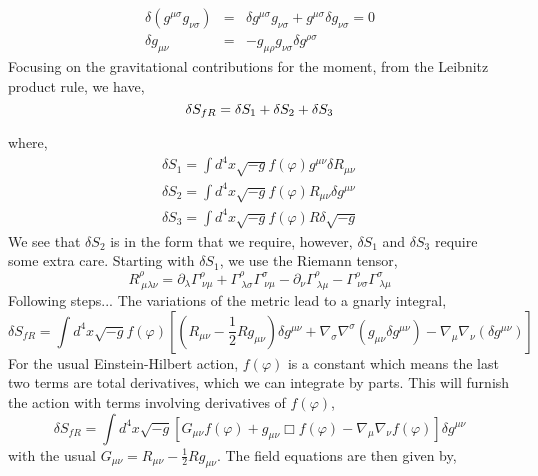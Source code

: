 \begin{eqnarray}
    \delta(g^{\mu\sigma}g_{\nu\sigma}) &=& \delta g^{\mu\sigma}g_{\nu\sigma} + g^{\mu\sigma}\delta g_{\nu\sigma}= 0 \nonumber\\
    \delta g_{\mu\nu} &=& -g_{\mu\rho}g_{\nu\sigma}\delta g^{\rho\sigma}
\end{eqnarray}
Focusing on the gravitational contributions for the moment, from the Leibnitz product rule, we have,
\begin{equation}
    \delta S_{fR} = \delta S_1 + \delta S_2 + \delta S_3\\
\end{equation}

where,
\begin{eqnarray*}
    \delta S_1 = \int d^4 x \sqrt{-g} f(\varphi) g^{\mu\nu}\delta R_{\mu\nu}\\
    \delta S_2 = \int d^4 x \sqrt{-g} f(\varphi) R_{\mu\nu} \delta g^{\mu\nu}\\
    \delta S_3 = \int d^4 x \sqrt{-g} f(\varphi) R\delta\sqrt{-g}
\end{eqnarray*}
We see that $\delta S_2$ is in the form that we require, however, $\delta S_1$ and $\delta S_3$ require some extra care. Starting with $\delta S_1$, we use the Riemann tensor, 
\begin{equation}
    R^{\rho}_{\ \mu \lambda \nu} = \partial_{\lambda}\Gamma^{\rho}_{\ \nu \mu} + \Gamma^{\rho}_{\ \lambda \sigma} \Gamma^{\sigma}_{\ \nu\mu} - \partial_{\nu}\Gamma^{\rho}_{\ \lambda \mu} - \Gamma^{\rho}_{\ \nu \sigma} \Gamma^{\sigma}_{\ \lambda\mu}
\end{equation}
Following steps...
The variations of the metric lead to a gnarly integral, 
\begin{equation}
    \delta S_{fR} = \int d^4x\sqrt{-g}f(\varphi)\left[\left(R_{\mu\nu}- \frac{1}{2} Rg_{\mu\nu}\right)\delta g^{\mu\nu} + \nabla_{\sigma}\nabla^{\sigma}(g_{\mu\nu}\delta g^{\mu\nu}) - \nabla_{\mu}\nabla_{\nu}(\delta g^{\mu\nu})\right]
\end{equation}
For the usual Einstein-Hilbert action, $f(\varphi)$ is a constant which means the last two terms are total derivatives, which we can integrate by parts. This will furnish the action with terms involving derivatives of $f(\varphi)$,
\begin{equation}
    \delta S_{fR} = \int d^4x\sqrt{-g}\left[G_{\mu\nu}f(\varphi) + g_{\mu\nu}\Box f(\varphi)  - \nabla_{\mu}\nabla_{\nu}f(\varphi)\right]\delta g^{\mu\nu}
\end{equation}
with the usual $G_{\mu\nu} = R_{\mu\nu}- \frac{1}{2} Rg_{\mu\nu}$. The field equations are then given by, 
